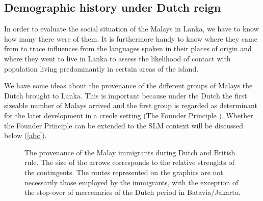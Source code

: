 \subsection{Demographic history under Dutch reign}\label{sec:slmbg:DemographichistoryunderDutchreign}
In order to evaluate the social situation of the Malays in Lanka,
we have to know how many there were of them. It is furthermore
handy to know where they came from to trace  influences from the
languages spoken in their places of origin and where they went to
live in Lanka to assess the likelihood of contact with population
living predominantly in certain areas of the island.

We have some ideas about the provenance of the different groups of Malays the Dutch  brought to Lanka. This is important because under the Dutch the first sizeable number of Malays arrived and the first group is regarded as determinant for the later development in a creole setting (The Founder Principle \citep{abc} ). Whether the Founder Principle can be extended to the SLM context will be discussed below (\ref{abc}).


\begin{figure}
 \centering
 \caption[Provenance of the Malay immigrants during Dutch and British rule]{The provenance of the Malay immigrants during Dutch and British rule. The size of the arrows corresponds to the relative strenghts of the contingents. The routes represented on the graphics are not necessarily those employed by the immigrants, with the exception of the stop-over of mercenaries of the Dutch period in Batavia/Jakarta.}
 \label{fig:provenanceDutchBritish}
\end{figure}


